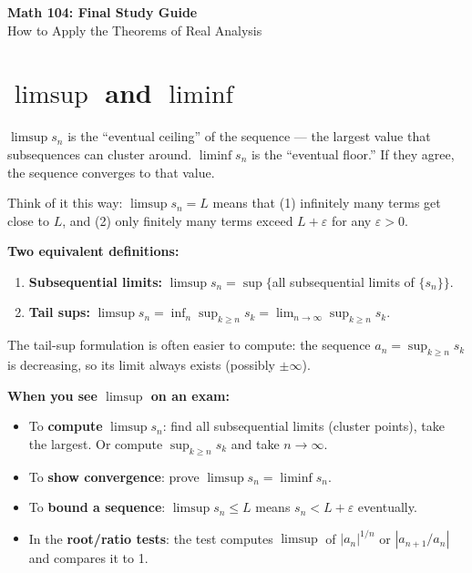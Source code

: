 \documentclass[11pt]{article}
\newcommand{\eps}{\varepsilon}
\theoremstyle{definition}
\begin{document}
\begin{center}
{\LARGE\bfseries Math 104: Final Study Guide}\\[6pt]
{\large How to Apply the Theorems of Real Analysis}
\end{center}

\tableofcontents
\newpage

\section{$\limsup$ and $\liminf$}

\begin{intuition}
$\limsup s_n$ is the ``eventual ceiling'' of the sequence --- the largest value that subsequences can cluster around. $\liminf s_n$ is the ``eventual floor.'' If they agree, the sequence converges to that value.

Think of it this way: $\limsup s_n = L$ means that (1) infinitely many terms get close to $L$, and (2) only finitely many terms exceed $L + \eps$ for any $\eps > 0$.
\end{intuition}

\textbf{Two equivalent definitions:}
\begin{enumerate}
\item \textbf{Subsequential limits:} $\limsup s_n = \sup\{$all subsequential limits of $\{s_n\}\}$.
\item \textbf{Tail sups:} $\limsup s_n = \inf_{n} \sup_{k \geq n} s_k = \lim_{n \to \infty} \sup_{k \geq n} s_k$.
\end{enumerate}

The tail-sup formulation is often easier to compute: the sequence $a_n = \sup_{k \geq n} s_k$ is decreasing, so its limit always exists (possibly $\pm\infty$).

\begin{application}
\textbf{When you see $\limsup$ on an exam:}
\begin{itemize}
\item To \textbf{compute} $\limsup s_n$: find all subsequential limits (cluster points), take the largest. Or compute $\sup_{k \geq n} s_k$ and take $n \to \infty$.
\item To \textbf{show convergence}: prove $\limsup s_n = \liminf s_n$.
\item To \textbf{bound a sequence}: $\limsup s_n \leq L$ means $s_n < L + \eps$ eventually.
\item In the \textbf{root/ratio tests}: the test computes $\limsup$ of $|a_n|^{1/n}$ or $|a_{n+1}/a_n|$ and compares it to 1.
\end{itemize}
\end{application}
\end{document}
